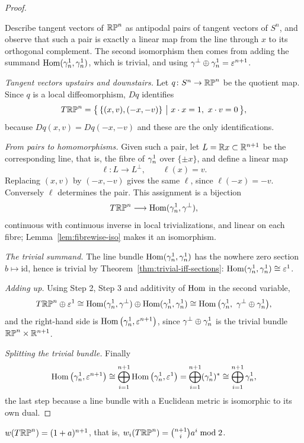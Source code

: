 \begin{proof}
\begin{strategy}
Describe tangent vectors of $\mathbb{RP}^n$ as antipodal pairs of tangent vectors of
$S^n$, and observe that such a pair is exactly a linear map from the line
through $x$ to its orthogonal complement. The second isomorphism then comes from
adding the summand $\operatorname{Hom}(\gamma^1_n,\gamma^1_n)$, which is trivial, and using
$\gamma^\perp\oplus\gamma^1_n=\varepsilon^{n+1}$.
\end{strategy}

 \emph{Tangent vectors upstairs and downstairs.} Let $q\colon S^n\to
\mathbb{RP}^n$ be the quotient map. Since $q$ is a local diffeomorphism, $Dq$ identifies
\[
T\mathbb{RP}^n=\big\{\,\{(x,v),(-x,-v)\}\ \big|\ x\cdot x=1,\ x\cdot v=0\,\big\},
\]
because $Dq(x,v)=Dq(-x,-v)$ and these are the only identifications.

 \emph{From pairs to homomorphisms.} Given such a pair, let
$L=\mathbb{R} x\subset\mathbb{R}^{n+1}$ be the corresponding line, that is, the fibre of $\gamma^1_n$
over $\{\pm x\}$, and define a linear map
\[
\ell\colon L\longrightarrow L^\perp,
\qquad
\ell(x)=v .
\]
Replacing $(x,v)$ by $(-x,-v)$ gives the same $\ell$, since
$\ell(-x)=-v$. Conversely $\ell$ determines the pair. This assignment is a
bijection
\[
T\mathbb{RP}^n\longrightarrow \operatorname{Hom}(\gamma^1_n,\gamma^\perp),
\]
continuous with continuous inverse in local trivializations, and linear on each
fibre; Lemma~\ref{lem:fibrewise-iso} makes it an isomorphism.

 \emph{The trivial summand.} The line bundle
$\operatorname{Hom}(\gamma^1_n,\gamma^1_n)$ has the nowhere zero section $b\mapsto\mathrm{id}$, hence
is trivial by Theorem~\ref{thm:trivial-iff-sections}:
$\operatorname{Hom}(\gamma^1_n,\gamma^1_n)\cong\varepsilon^1$.

 \emph{Adding up.} Using Step 2, Step 3 and additivity of $\operatorname{Hom}$ in the
second variable,
\[
T\mathbb{RP}^n\oplus\varepsilon^1
\cong\operatorname{Hom}(\gamma^1_n,\gamma^\perp)\oplus\operatorname{Hom}(\gamma^1_n,\gamma^1_n)
\cong\operatorname{Hom}\big(\gamma^1_n,\ \gamma^\perp\oplus\gamma^1_n\big),
\]
and the right-hand side is $\operatorname{Hom}\big(\gamma^1_n,\varepsilon^{n+1}\big)$,
since $\gamma^\perp\oplus\gamma^1_n$ is the trivial bundle
$\mathbb{RP}^n\times\mathbb{R}^{n+1}$.

 \emph{Splitting the trivial bundle.} Finally
\[
\operatorname{Hom}\big(\gamma^1_n,\varepsilon^{n+1}\big)
\cong\bigoplus_{i=1}^{n+1}\operatorname{Hom}\big(\gamma^1_n,\varepsilon^1\big)
=\bigoplus_{i=1}^{n+1}(\gamma^1_n)^*
\cong\bigoplus_{i=1}^{n+1}\gamma^1_n,
\]
the last step because a line bundle with a Euclidean metric is isomorphic to its
own dual.
\end{proof}

\begin{theorem}\label{thm:w-RPn}
$w(T\mathbb{RP}^n)=(1+a)^{n+1}$, that is,
$w_i(T\mathbb{RP}^n)=\binom{n+1}{i}a^i\bmod 2$.
\end{theorem}

